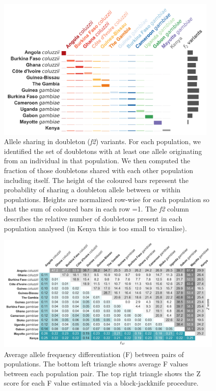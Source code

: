 \documentclass[a4paper,11pt,abstracton,hidelinks]{scrartcl}
\begin{document}
\begin{figure}[H]
	\begin{center}
		\includegraphics*[width=4.3in]{artwork/doubletons.jpeg}
	\end{center}
	\caption{Allele sharing in doubleton (\textit{f2}) variants. For each population, we identified the set of doubletons with at least one allele originating from an individual in that population. We then computed the fraction of those doubletons shared with each other population including itself. The height of the coloured bars represent the probability of sharing a doubleton allele between or within populations. Heights are normalized row-wise for each population so that the sum of coloured bars in each row =1. The \textit{f2} column describes the relative number of doubletons present in each population analysed (in Kenya this is too small to visualise).
}
	\label{doubletons}
\end{figure}

\begin{figure}[H]
	\begin{center}
		\includegraphics*[width=5.3in]{artwork/pairwise_fst.jpeg}
	\end{center}
	\caption{Average allele frequency differentiation (F) between pairs of populations. The bottom left triangle shows average F values between each population pair. The top right triangle shows the Z score for each F value estimated via a block-jackknife procedure.}
	\label{fst}
\end{figure}
\end{document}
